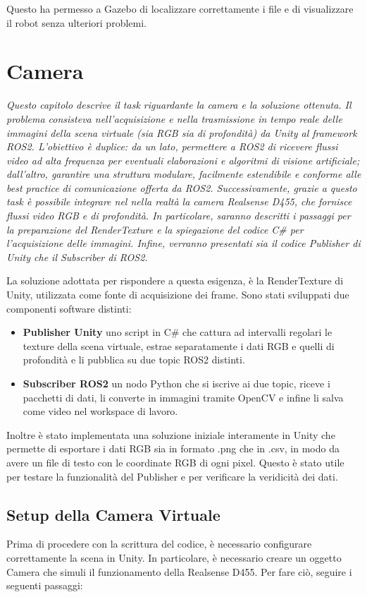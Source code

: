 \documentclass[11pt]{report}
\begin{document}
Questo ha permesso a Gazebo di localizzare correttamente i file e di visualizzare il robot senza ulteriori problemi.


\section{Camera}
\textit{Questo capitolo descrive il task riguardante la camera e la soluzione ottenuta. Il problema consisteva nell’acquisizione e nella trasmissione in tempo reale delle immagini della scena virtuale (sia RGB sia di profondità) da Unity al framework ROS2. L’obiettivo è duplice: da un lato, permettere a ROS2 di ricevere flussi video ad alta frequenza per eventuali elaborazioni e algoritmi di visione artificiale; dall’altro, garantire una struttura modulare, facilmente estendibile e conforme alle best practice di comunicazione offerta da ROS2. Successivamente, grazie a questo task è possibile integrare nel nella realtà la camera Realsense D455, che fornisce flussi video RGB e di profondità. In particolare, saranno descritti i passaggi per la preparazione del RenderTexture e la spiegazione del codice C\# per l’acquisizione delle immagini. Infine, verranno presentati sia il codice Publisher di Unity che il Subscriber di ROS2.}

La soluzione adottata per rispondere a questa esigenza, è la RenderTexture di Unity, utilizzata come fonte di acquisizione dei frame. Sono stati sviluppati due componenti software distinti:
\begin{itemize}
    \item \textbf{Publisher Unity} uno script in C\# che cattura ad intervalli regolari le texture della scena virtuale, estrae separatamente i dati RGB e quelli di profondità e li pubblica su due topic ROS2 distinti.

    \item \textbf{Subscriber ROS2} un nodo Python che si iscrive ai due topic, riceve i pacchetti di dati, li converte in immagini tramite OpenCV e infine li salva come video nel workspace di lavoro.
\end{itemize}

Inoltre è stato implementata una soluzione iniziale interamente in Unity che permette di esportare i dati RGB sia in formato .png che in .csv, in modo da avere un file di testo con le coordinate RGB di ogni pixel. Questo è stato utile per testare la funzionalità del Publisher e per verificare la veridicità dei dati.

\subsection{Setup della Camera Virtuale}
Prima di procedere con la scrittura del codice, è necessario configurare correttamente la scena in Unity. In particolare, è necessario creare un oggetto Camera che simuli il funzionamento della Realsense D455. Per fare ciò, seguire i seguenti passaggi:
\end{document}
